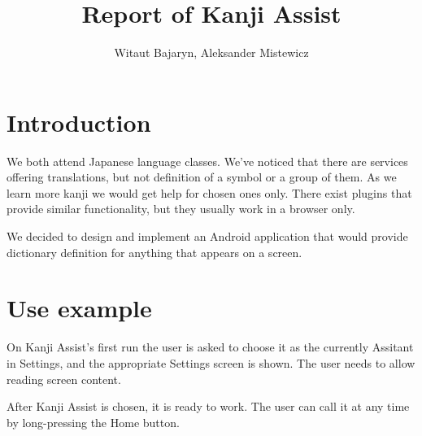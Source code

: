 \documentclass[11pt,a4paper]{article}
\title{Report of Kanji Assist}
\author{Witaut Bajaryn, Aleksander Mistewicz}
\begin{document}
\maketitle
\newpage

\section{Introduction}

We both attend Japanese language classes. We've noticed that there are services
offering translations, but not definition of a symbol or a group of them.
As we learn more kanji we would get help for chosen ones only.
There exist plugins that provide similar functionality, but they usually
work in a browser only.

We decided to design and implement an Android application that would
provide dictionary definition for anything that appears on a screen.

\section{Use example}

On Kanji Assist's first run the user is asked
to choose it as the currently Assitant in Settings, and the appropriate
Settings screen is shown. The user needs to allow reading screen content.

After Kanji Assist is chosen, it is ready to work.
The user can call it at any time by long-pressing the Home button.
\end{document}
